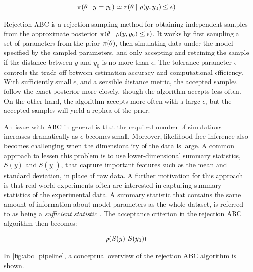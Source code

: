 \begin{equation}
    \pi \qty(\theta \mid y=y_0) \simeq \pi \qty(\theta \mid \rho \qty(y, y_0) \leq \epsilon)
\end{equation}


Rejection ABC is a rejection-sampling method for obtaining independent samples from the approximate posterior $ \pi \qty(\theta \mid \rho \qty(y, y_0) \leq \epsilon)$. It works by first sampling a set of parameters from the prior $\pi \qty(\theta)$, then simulating data under the model specified by the sampled parameters, and only accepting and retaining the sample if the distance between $y$ and $y_0$ is no more than $\epsilon$. The tolerance parameter $\epsilon$ controls the trade-off between estimation accuracy and computational efficiency. With sufficiently small $\epsilon$, and a sensible distance metric, the accepted samples follow the exact posterior more closely, though the algorithm accepts less often. On the other hand, the algorithm accepts more often with a large $\epsilon$, but the accepted samples will yield a replica of the prior.

An issue with ABC in general is that the required number of simulations increases dramatically as $\epsilon$ becomes small. Moreover, likelihood-free inference also becomes challenging when the dimensionality of the data is large. A common approach to lessen this problem is to use lower-dimensional summary statistics, $S(y)$ and $S(y_0)$, that capture important features such as the mean and standard deviation, in place of raw data. %
A further motivation for this approach is that real-world experiments often are interested in capturing summary statistics of the experimental data. A summary statistic that contains the same amount of information about model parameters as the whole dataset, is referred to as being a \textit{sufficient statistic} \cite{ABCprimer}. The acceptance criterion in the rejection ABC algorithm then becomes:

\begin{equation}
    \rho \qty(S(y), S(y_0))
\end{equation}

In \autoref{fig:abc_pipeline}, a conceptual overview of the rejection ABC algorithm is shown. 

